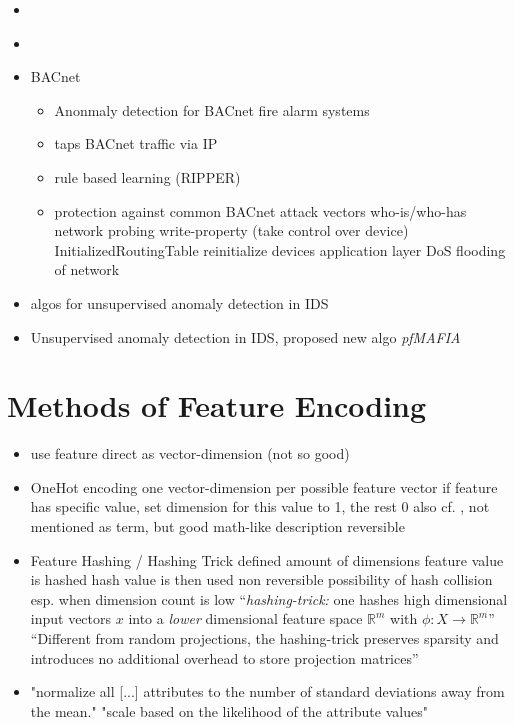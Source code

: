 \begin{itemize}
	\item \parencite{Yang2006}
	\item \parencite{Celeda2012}
	\item \textcite{Pan2014} BACnet
		\begin{itemize}
			\item Anonmaly detection for BACnet fire alarm systems
			\item taps BACnet traffic via IP
			\item rule based learning (RIPPER)
			\item protection against common BACnet attack vectors
				\subitem who-is/who-has network probing
				\subitem write-property (take control over device)
				\subitem InitializedRoutingTable
				\subitem reinitialize devices
				\subitem application layer DoS
				\subitem flooding of network
		\end{itemize}
	
	\item \textcite{Eskin2002} algos for unsupervised anomaly detection in IDS
	\item \textcite{Leung2005} Unsupervised anomaly detection in IDS, proposed new algo \emph{pfMAFIA}
\end{itemize}

\section{Methods of Feature Encoding}
\label{sec:background:network:features}
\label{sec:background:network:features:hashing}
\label{sec:background:network:features:onehot}

\begin{itemize}
	\item use feature direct as vector-dimension (not so good)
	\item OneHot encoding
		\subitem one vector-dimension per possible feature vector
		\subitem if feature has specific value, set dimension for this value to 1, the rest 0
		\subitem also cf. \textcite[][p. 12]{Eskin2002}, not mentioned as term, but good math-like description
		\subitem reversible
	\item Feature Hashing / Hashing Trick
		\subitem defined amount of dimensions
		\subitem feature value is hashed
		\subitem hash value is then used
		\subitem non reversible
		\subitem possibility of hash collision
		\subitem esp. when dimension count is low
		\subitem \enquote{\emph{hashing-trick:} one hashes high dimensional input vectors $x$ into a \emph{lower} dimensional feature space $\mathbb{R}^m$ with $\phi: X \rightarrow \mathbb{R}^m$} \parencite{Weinberger2009,Shi2009,Langford2007}
		\subitem \enquote{Different from random projections, the hashing-trick preserves sparsity and introduces no additional overhead to store projection matrices} \parencite{Weinberger2009}
	\item "normalize all [...] attributes to the number of standard deviations away from the mean." \parencite{Eskin2002}
		\subitem "scale based on the likelihood of the attribute values" \parencite{Eskin2002}
		
\end{itemize}